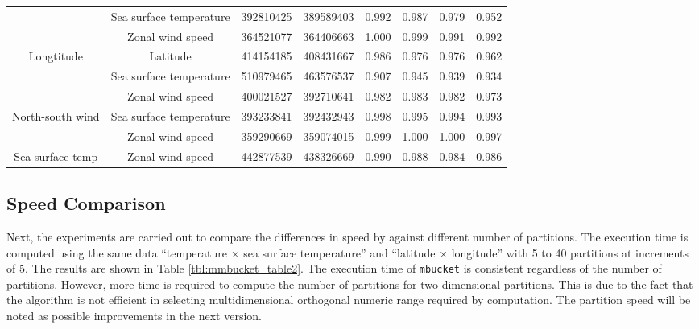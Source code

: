 \begin{table}[hbt]
\begin{center}
{\begin{tabular}{c|c||c|c|c|c|c|c}
            & Sea surface temperature &392810425 &389589403 &0.992 &0.987 &0.979 &0.952 \\
            &  Zonal wind speed &364521077 &364406663 &1.000 &0.999 &0.991 &0.992 \\ \hline
Longtitude        & Latitude &414154185 &408431667 &0.986 &0.976 &0.976 &0.962 \\
            & Sea surface temperature &510979465 &463576537 &0.907 &0.945 &0.939 &0.934 \\
            & Zonal wind speed &400021527 &392710641 &0.982 &0.983 &0.982 &0.973 \\ \hline
North-south wind    & Sea surface temperature &393233841 &392432943 &0.998 &0.995 &0.994 &0.993 \\
            & Zonal wind speed &359290669 &359074015 &0.999 &1.000 &1.000 &0.997 \\ \hline
Sea surface temp    & Zonal wind speed &442877539 &438326669 &0.990 &0.988 &0.984 &0.986 \\ \hline
\end{tabular}
}
\end{center}
\end{table}
 
\subsection*{Speed Comparison}

Next, the experiments are carried out to compare the differences in speed by against different  number of partitions. The execution time is computed using the same data “temperature × sea surface temperature” and “latitude × longitude” with 5 to 40 partitions at increments of 5.  The results are shown in Table \ref{tbl:mmbucket_table2}. The execution time of \verb|mbucket| is consistent regardless of the number of partitions. However, more time is required to compute the number of partitions for two dimensional partitions. This is due to the fact that the algorithm is not efficient in selecting multidimensional orthogonal numeric range required by computation. The partition speed will be noted as possible improvements in the next version. 


